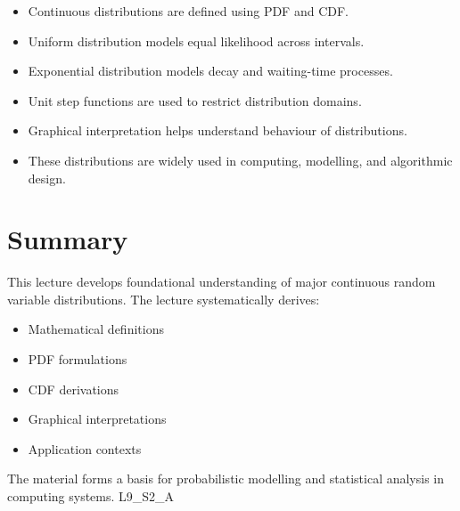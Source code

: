 \documentclass[12pt]{article}
\begin{document}
\begin{itemize}
\item Continuous distributions are defined using PDF and CDF.
\item Uniform distribution models equal likelihood across intervals.
\item Exponential distribution models decay and waiting-time processes.
\item Unit step functions are used to restrict distribution domains.
\item Graphical interpretation helps understand behaviour of distributions.
\item These distributions are widely used in computing, modelling, and algorithmic design.
\end{itemize}

\section{Summary}
This lecture develops foundational understanding of major continuous random variable distributions. The lecture systematically derives:

\begin{itemize}
\item Mathematical definitions
\item PDF formulations
\item CDF derivations
\item Graphical interpretations
\item Application contexts
\end{itemize}

The material forms a basis for probabilistic modelling and statistical analysis in computing systems. L9\_S2\_A
\end{document}
